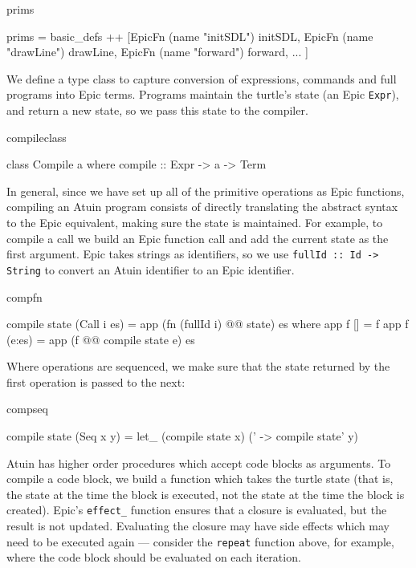 \begin{SaveVerbatim}{prims}

prims = basic_defs ++ [EpicFn (name "initSDL") initSDL,
                       EpicFn (name "drawLine") drawLine,
                       EpicFn (name "forward") forward, ... ]

\end{SaveVerbatim}

\noindent
We define a type class to capture conversion of expressions, commands
and full programs into Epic terms. Programs
maintain the turtle's state (an Epic \texttt{Expr}), and return a new
state, so we pass this state to the compiler.

\begin{SaveVerbatim}{compileclass}

class Compile a where
    compile :: Expr -> a -> Term

\end{SaveVerbatim}

\noindent
In general, since we have set up all of the primitive operations as
Epic functions, compiling an Atuin program consists of directly
translating the abstract syntax to the Epic equivalent, making sure
the state is maintained. For example, to compile a call we
build an Epic function call and add the current state as the first
argument. Epic takes strings as identifiers, so we use \texttt{fullId
  :: Id -> String} to convert an Atuin identifier to an Epic identifier.

\begin{SaveVerbatim}{compfn}

compile state (Call i es) = app (fn (fullId i) @@ state) es
   where app f [] = f
         app f (e:es) = app (f @@ compile state e) es

\end{SaveVerbatim}

\noindent
Where operations are sequenced, we make sure that the state returned
by the first operation is passed to the next:

\begin{SaveVerbatim}{compseq}

compile state (Seq x y) 
   = let_ (compile state x) (\state' -> compile state' y)

\end{SaveVerbatim}

Atuin has higher order procedures which accept code blocks as
arguments. To compile a code block, we build a function which
takes the turtle state (that is, the state at the time the block is
executed, not the state at the time the block is created). 
Epic's
\texttt{effect\_} function ensures that a closure is evaluated, but
the result is not updated. Evaluating the closure may have side
effects which may need to be executed again --- consider the
\texttt{repeat} function above, for example, where the code block
should be evaluated on each iteration.

